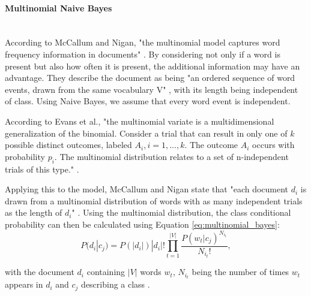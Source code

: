         \paragraph{Multinomial Naive Bayes} \mbox{} \\

        According to McCallum and Nigan, "the multinomial model captures word frequency information in documents" \cite[p.~3]{Mccallum1998}. By considering not only if a word is present but also how often it is present, the additional information may have an advantage. They describe the document as being "an ordered sequence of word events, drawn from the same vocabulary V" \cite[p.~3]{Mccallum1998}, with its length being independent of class. Using Naive Bayes, we assume that every word event is independent.
        
        According to Evans et al., "the multinomial variate is a multidimensional generalization of the binomial. Consider a trial that can result in only one of $k$ possible distinct outcomes, labeled $A_i, i = 1,...,k$. The outcome $A_i$ occurs with probability $p_i$. The multinomial distribution relates to a set of n-independent trials of this type." \cite[p.~135]{evans2011statistical}.
        
        Applying this to the model, McCallum and Nigan state that "each document $d_i$ is drawn from a multinomial distribution of words with as many independent trials as the length of $d_i$" \cite[p.~3]{Mccallum1998}. Using the multinomial distribution, the class conditional probability can then be calculated using Equation \eqref{eq:multinomial_bayes}:
        \begin{equation}
            \label{eq:multinomial_bayes}
                P(d_i|c_j) = P(|d_i|)|d_i|!\prod_{t=1}^{|V|}\frac{P(w_t|c_j)^{N_{i_t}}}{N_{i_t}!},
        \end{equation}
        
        with the document $d_i$ containing $|V|$ words $w_t$, $N_{i_t}$ being the number of times $w_t$ appears in $d_i$ and $c_j$ describing a class \cite{Mccallum1998}. 
        
